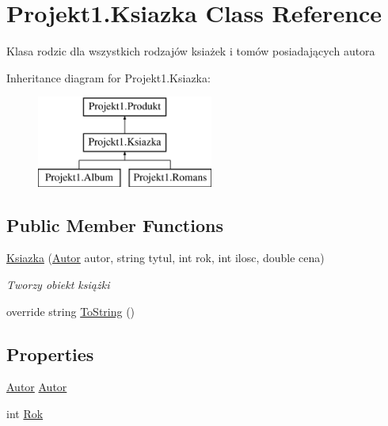 \hypertarget{class_projekt1_1_1_ksiazka}{}\section{Projekt1.\+Ksiazka Class Reference}
\label{class_projekt1_1_1_ksiazka}


Klasa \textquotesingle{}rodzic\textquotesingle{} dla wszystkich rodzajów ksiażek i tomów posiadających autora  


Inheritance diagram for Projekt1.\+Ksiazka\+:\begin{figure}[H]
\begin{center}
\leavevmode
\includegraphics[height=3.000000cm]{class_projekt1_1_1_ksiazka}
\end{center}
\end{figure}
\subsection*{Public Member Functions}
\begin{DoxyCompactItemize}
\item 
\mbox{\hyperlink{class_projekt1_1_1_ksiazka_a8e2415da7fd1cd173539de4523d54176}{Ksiazka}} (\mbox{\hyperlink{class_projekt1_1_1_autor}{Autor}} autor, string tytul, int rok, int ilosc, double cena)
\begin{DoxyCompactList}\small\item\em Tworzy obiekt książki \end{DoxyCompactList}\item 
override string \mbox{\hyperlink{class_projekt1_1_1_ksiazka_aed58d16229eec2dfa75ef26332de45a5}{To\+String}} ()
\end{DoxyCompactItemize}
\subsection*{Properties}
\begin{DoxyCompactItemize}
\item 
\mbox{\hyperlink{class_projekt1_1_1_autor}{Autor}} \mbox{\hyperlink{class_projekt1_1_1_ksiazka_a1cfd38a68b3df3433d79869c032052a2}{Autor}}
\item 
int \mbox{\hyperlink{class_projekt1_1_1_ksiazka_ad80bf26ad51f93ea27152769ae52c91f}{Rok}}
\end{DoxyCompactItemize}


